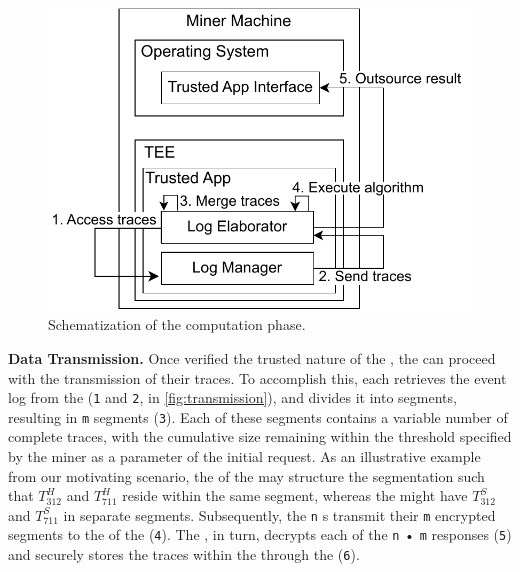 \begin{figure}
	\vspace{-3em}
	\includegraphics[width=1\textwidth]{content/figures/computationworkflow.pdf}
	\caption[A gull]{Schematization of the computation phase.}
	\vspace{-6pt}
	\label{fig:workflow2}
\end{figure}
\textbf{Data Transmission.} Once verified the trusted nature of the , the  can proceed with the transmission of their traces. To accomplish this, each  retrieves the event log from the  (\texttt{1} and \texttt{2}, in \cref{fig:transmission}), and divides it into segments, resulting in \texttt{m} segments (\texttt{3}). Each of these segments contains a variable number of complete traces, with the cumulative size remaining within the threshold specified by the miner as a parameter of the initial request. As an illustrative example from our motivating scenario, the  of the  may structure the segmentation such that $T^H_{312}$ and $T^H_{711}$ reside within the same segment, whereas the  might have $T^S_{312}$ and $T^S_{711}$ in separate segments. Subsequently, the \texttt{n} s transmit their \texttt{m} encrypted segments to the  of the  (\texttt{4}). The , in turn, decrypts each of the \texttt{n} • \texttt{m} responses (\texttt{5}) and securely stores the traces within the  through the  (\texttt{6}).

